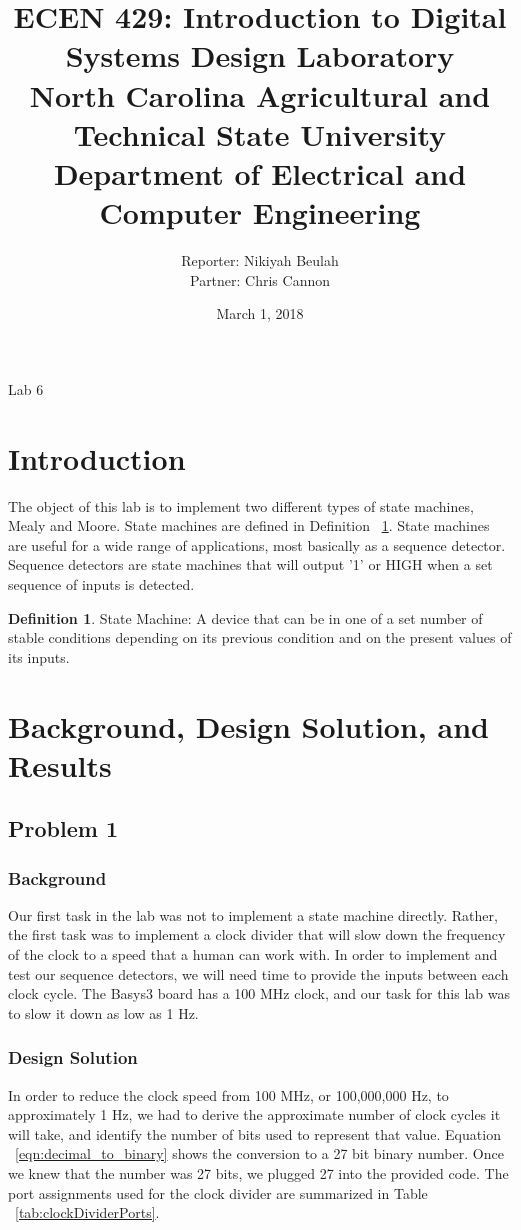 \documentclass[11pt]{article}
\title {{\titleFont ECEN 429: Introduction to Digital Systems Design Laboratory \\ North Carolina Agricultural and Technical State University \\ Department of Electrical and Computer Engineering}} %
\author{\titleFont Reporter: Nikiyah Beulah\\ \titleFont Partner: Chris Cannon} %
\date{\titleFont March 1, 2018}
\begin{document}
\begin{titlingpage}
\maketitle
\begin{center}
	Lab 6
\end{center}
\end{titlingpage}

\section{Introduction}
The object of this lab is to implement two different types of state machines, Mealy and Moore. State machines are defined in Definition ~\ref{def:state_machine}. State machines are useful for a wide range of applications, most basically as a sequence detector. Sequence detectors are state machines that will output '1' or HIGH when a set sequence of inputs is detected.

\theoremstyle{definition}
\newtheorem{definition}{Definition}
\begin{definition}
State Machine: A device that can be in one of a set number of stable conditions depending on its previous condition and on the present values of its inputs.
\label{def:state_machine}
\end{definition}

\section{Background, Design Solution, and Results}

\subsection{Problem 1 }

\subsubsection{Background}
Our first task in the lab was not to implement a state machine directly. Rather, the first task was to implement a clock divider that will slow down the frequency of the clock to a speed that a human can work with. In order to implement and test our sequence detectors, we will need time to provide the inputs between each clock cycle. The Basys3 board has a 100 MHz clock, and our task for this lab was to slow it down as low as 1 Hz.

\subsubsection{Design Solution}
In order to reduce the clock speed from 100 MHz, or 100,000,000 Hz, to approximately 1 Hz, we had to derive the approximate number of clock cycles it will take, and identify the number of bits used to represent that value. Equation ~\ref{eqn:decimal_to_binary} shows the conversion to a 27 bit binary number. Once we knew that the number was 27 bits, we plugged 27 into the provided code. The port assignments used for the clock divider are summarized in Table ~\ref{tab:clockDividerPorts}.
\end{document}
